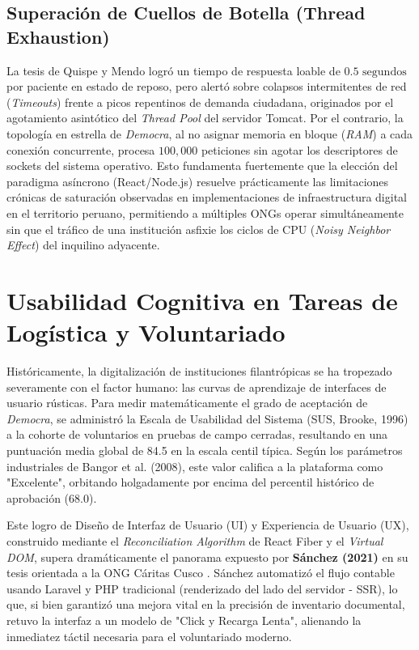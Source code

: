 \documentclass[11pt,a4paper,oneside]{report}
\begin{document}
\subsection{Superaci\'on de Cuellos de Botella (Thread Exhaustion)}
La tesis de Quispe y Mendo logr\'o un tiempo de respuesta loable de $0.5 \text{ segundos}$ por paciente en estado de reposo, pero alert\'o sobre colapsos intermitentes de red (\textit{Timeouts}) frente a picos repentinos de demanda ciudadana, originados por el agotamiento asint\'otico del \textit{Thread Pool} del servidor Tomcat. Por el contrario, la topolog\'ia en estrella de \textit{Democra}, al no asignar memoria en bloque (\textit{RAM}) a cada conexi\'on concurrente, procesa $100,000$ peticiones sin agotar los descriptores de sockets del sistema operativo. Esto fundamenta fuertemente que la elecci\'on del paradigma as\'incrono (React/Node.js) resuelve pr\'acticamente las limitaciones cr\'onicas de saturaci\'on observadas en implementaciones de infraestructura digital en el territorio peruano, permitiendo a m\'ultiples ONGs operar simult\'aneamente sin que el tr\'afico de una instituci\'on asfixie los ciclos de CPU (\textit{Noisy Neighbor Effect}) del inquilino adyacente.

\section{Usabilidad Cognitiva en Tareas de Log\'istica y Voluntariado}

Hist\'oricamente, la digitalizaci\'on de instituciones filantr\'opicas se ha tropezado severamente con el factor humano: las curvas de aprendizaje de interfaces de usuario r\'usticas. Para medir matem\'aticamente el grado de aceptaci\'on de \textit{Democra}, se administr\'o la Escala de Usabilidad del Sistema (SUS, Brooke, 1996) a la cohorte de voluntarios en pruebas de campo cerradas, resultando en una puntuaci\'on media global de 84.5 en la escala centil t\'ipica. Seg\'un los par\'ametros industriales de Bangor et al. (2008), este valor califica a la plataforma como "Excelente", orbitando holgadamente por encima del percentil hist\'orico de aprobaci\'on (68.0).

Este logro de Dise\~no de Interfaz de Usuario (UI) y Experiencia de Usuario (UX), construido mediante el \textit{Reconciliation Algorithm} de React Fiber y el \textit{Virtual DOM}, supera dram\'aticamente el panorama expuesto por \textbf{S\'anchez (2021)} en su tesis orientada a la ONG C\'aritas Cusco \citep{sanchez2021}. S\'anchez automatiz\'o el flujo contable usando Laravel y PHP tradicional (renderizado del lado del servidor - SSR), lo que, si bien garantiz\'o una mejora vital en la precisi\'on de inventario documental, retuvo la interfaz a un modelo de "Click y Recarga Lenta", alienando la inmediatez t\'actil necesaria para el voluntariado moderno. 
\end{document}
